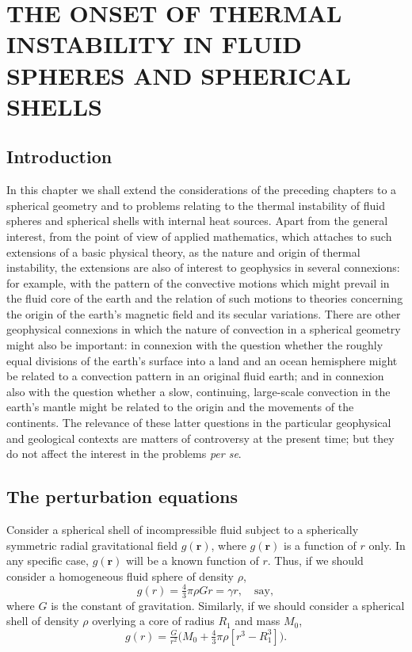 \chapter{THE ONSET OF THERMAL INSTABILITY IN FLUID SPHERES AND SPHERICAL SHELLS}
\label{ch:6}

\section{Introduction}\label{sec:55}
In this chapter we shall extend the considerations of the preceding
chapters to a spherical geometry and to problems relating to the thermal
instability of fluid spheres and spherical shells with internal heat sources.
Apart from the general interest, from the point of view of applied
mathematics, which attaches to such extensions of a basic physical
theory, as the nature and origin of thermal instability, the extensions
are also of interest to geophysics in several connexions: for example,
with the pattern of the convective motions which might prevail in the
fluid core of the earth and the relation of such motions to theories con\-cerning the origin of the earth's magnetic field and its secular variations.
There are other geophysical connexions in which the nature of convection
in a spherical geometry might also be important: in connexion with the
question whether the roughly equal divisions of the earth's surface into a
land and an ocean hemisphere might be related to a convection pattern
in an original fluid earth; and in connexion also with the question whether
a slow, continuing, large-scale convection in the earth's mantle might be
related to the origin and the movements of the continents. The relevance
of these latter questions in the particular geophysical and geological
contexts are matters of controversy at the present time; but they do not
affect the interest in the problems \emph{per se}.

\section{The perturbation equations}\label{sec:56}
Consider a spherical shell of incompressible fluid subject to a spheri\-cally symmetric radial gravitational field $g(\boldsymbol{r})$, where $g(\boldsymbol{r})$ is a function
of $r$ only. In any specific case, $g(\boldsymbol{r})$ will be a known function of $r$. Thus,
if we should consider a homogeneous fluid sphere of density $\rho$,
\begin{equation}\label{eq:6-1}
g(r) = \tfrac{4}{3}\pi\rho G r = \gamma r,\quad\text{say},
\end{equation}
where $G$ is the constant of gravitation. Similarly, if we should consider
a spherical shell of density $\rho$ overlying a core of radius $R_1$ and mass $M_0$,
\begin{equation}\label{eq:6-2}
g(r) = \tfrac{G}{r^2}\bigl(M_0+\tfrac{4}{3}\pi\rho[r^3-R_1^3]\bigr).
\end{equation}

